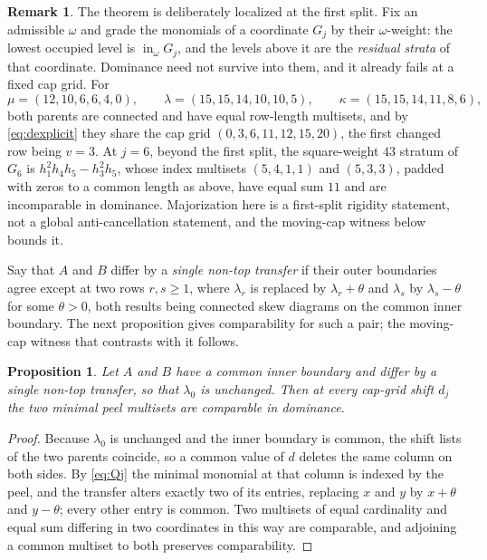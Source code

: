 \documentclass[11pt,a4paper]{amsart}
\numberwithin{equation}{section}
\theoremstyle{plain}
\newtheorem{proposition}[theorem]{Proposition}
\theoremstyle{definition}
\newtheorem{remark}[theorem]{Remark}
\newcommand{\inin}{\operatorname{in}}
\begin{document}
\begin{remark}\label{rem:higher-strata}
The theorem is deliberately localized at the first split.  Fix an admissible \(\omega\) and grade the monomials of a coordinate \(G_j\) by their \(\omega\)-weight: the lowest occupied level is \(\inin_\omega G_j\), and the levels above it are the \emph{residual strata} of that coordinate.  Dominance need not survive into them, and it already fails at a fixed cap grid.  For
\[
\mu=(12,10,6,6,4,0),
\qquad
\lambda=(15,15,14,10,10,5),
\qquad
\kappa=(15,15,14,11,8,6),
\]
both parents are connected and have equal row-length multisets, and by \eqref{eq:dexplicit} they share the cap grid \((0,3,6,11,12,15,20)\), the first changed row being \(v=3\).  At \(j=6\), beyond the first split, the square-weight \(43\) stratum of \(G_6\) is \(h_1^2h_4h_5-h_3^2h_5\), whose index multisets \((5,4,1,1)\) and \((5,3,3)\), padded with zeros to a common length as above, have equal sum \(11\) and are incomparable in dominance.  Majorization here is a first-split rigidity statement, not a global anti-cancellation statement, and the moving-cap witness below bounds it.
\end{remark}

Say that \(A\) and \(B\) differ by a \emph{single non-top transfer} if their outer boundaries agree except at two rows \(r,s\ge1\), where \(\lambda_r\) is replaced by \(\lambda_r+\theta\) and \(\lambda_s\) by \(\lambda_s-\theta\) for some \(\theta>0\), both results being connected skew diagrams on the common inner boundary.  The next proposition gives comparability for such a pair; the moving-cap witness that contrasts with it follows.

\begin{proposition}\label{prop:cap-fixed-comparability}
Let \(A\) and \(B\) have a common inner boundary and differ by a single non-top transfer, so that \(\lambda_0\) is unchanged.  Then at every cap-grid shift \(d_j\) the two minimal peel multisets are comparable in dominance.
\end{proposition}

\begin{proof}
Because \(\lambda_0\) is unchanged and the inner boundary is common, the shift lists of the two parents coincide, so a common value of \(d\) deletes the same column on both sides.  By \eqref{eq:Qj} the minimal monomial at that column is indexed by the peel, and the transfer alters exactly two of its entries, replacing \(x\) and \(y\) by \(x+\theta\) and \(y-\theta\); every other entry is common.  Two multisets of equal cardinality and equal sum differing in two coordinates in this way are comparable, and adjoining a common multiset to both preserves comparability.
\end{proof}
\end{document}
